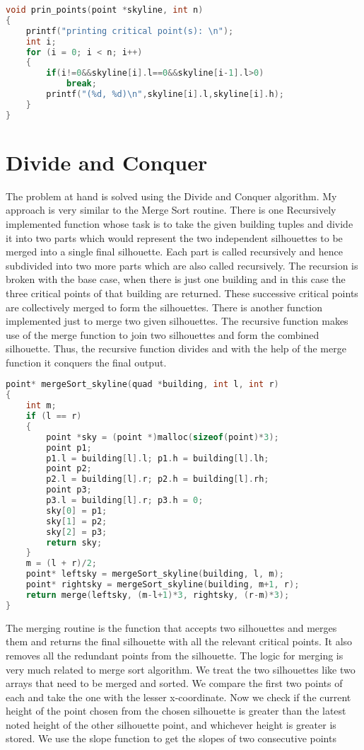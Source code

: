 \documentclass{article}
\begin{document}
\begin{lstlisting}[language=c, caption=print points]
void prin_points(point *skyline, int n)
{
    printf("printing critical point(s): \n");
    int i;
    for (i = 0; i < n; i++)
    {
        if(i!=0&&skyline[i].l==0&&skyline[i-1].l>0)
            break;
        printf("(%d, %d)\n",skyline[i].l,skyline[i].h);
    }
}
\end{lstlisting}

\clearpage

\section{Divide and Conquer}

The problem at hand is solved using the Divide and Conquer algorithm. My approach is very similar to the Merge Sort routine.
There is one Recursively implemented function whose task is to take the given building tuples and divide it into two parts which would represent the two independent silhouettes to be merged into a single final silhouette. Each part is called recursively and hence subdivided into two more parts which are also called recursively.
The recursion is broken with the base case, when there is just one building and in this case the three critical points of that building are returned.
These successive critical points are collectively merged to form the silhouettes.
There is another function implemented just to merge two given silhouettes. The recursive function makes use of the merge function to join two silhouettes and form the combined silhouette. Thus, the recursive function divides and with the help of the merge function it conquers the final output.

\begin{lstlisting}[language=c, caption=recursive function]
point* mergeSort_skyline(quad *building, int l, int r)
{
    int m;
    if (l == r)
    {
        point *sky = (point *)malloc(sizeof(point)*3);
        point p1;
        p1.l = building[l].l; p1.h = building[l].lh;
        point p2;
        p2.l = building[l].r; p2.h = building[l].rh;
        point p3;
        p3.l = building[l].r; p3.h = 0;
        sky[0] = p1;
        sky[1] = p2;
        sky[2] = p3;
        return sky;
    }
    m = (l + r)/2;
    point* leftsky = mergeSort_skyline(building, l, m);
    point* rightsky = mergeSort_skyline(building, m+1, r);
    return merge(leftsky, (m-l+1)*3, rightsky, (r-m)*3);
}
\end{lstlisting}

The merging routine is the function that accepts two silhouettes and merges them and returns the final silhouette with all the relevant critical points. It also removes all the redundant points from the silhouette.
The logic for merging is very much related to merge sort algorithm.
We treat the two silhouettes like two arrays that need to be merged and sorted. We compare the first two points of each and take the one with the lesser x-coordinate. Now we check if the current height of the point chosen from the chosen silhouette is greater than the latest noted height of the other silhouette point, and whichever height is greater is stored.
We use the slope function to get the slopes of two consecutive points
\end{document}
